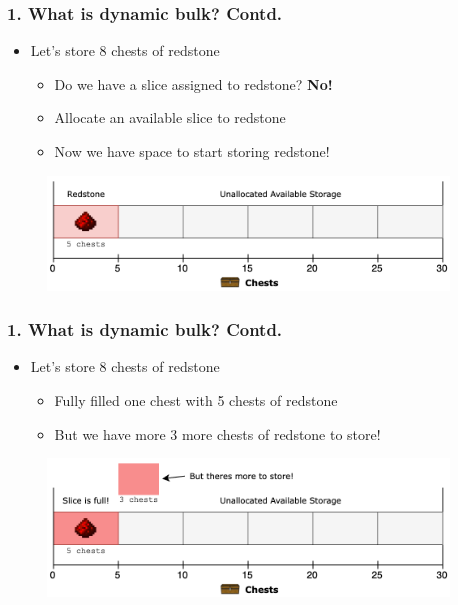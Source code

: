 \documentclass[aspectratio=169]{beamer}
\begin{document}
\begin{frame}
	\frametitle{1. What is dynamic bulk? Contd.}

    \begin{itemize}
		\item Let's store 8 chests of redstone
        \begin{itemize}
		\item Do we have a slice assigned to redstone? \textbf{No!}
        \item Allocate an available slice to redstone
        \item Now we have space to start storing redstone!
        \end{itemize}
	\end{itemize}

    \begin{figure}
        \includegraphics[width=0.95\textwidth]{logic1.png}
	\end{figure}
\end{frame}

\begin{frame}
	\frametitle{1. What is dynamic bulk? Contd.}

    \begin{itemize}
		\item Let's store 8 chests of redstone
        \begin{itemize}
        \item Fully filled one chest with 5 chests of redstone
		\item But we have more 3 more chests of redstone to store!
        \end{itemize}
	\end{itemize}

    \begin{figure}
        \includegraphics[width=0.95\textwidth]{logic2.png}
	\end{figure}
\end{frame}
\end{document}
